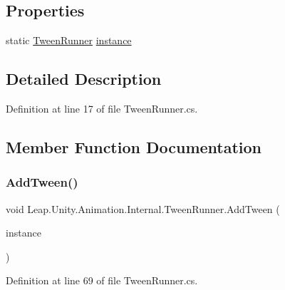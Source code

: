 \subsection*{Properties}
\begin{DoxyCompactItemize}
\item 
static \mbox{\hyperlink{class_leap_1_1_unity_1_1_animation_1_1_internal_1_1_tween_runner}{Tween\+Runner}} \mbox{\hyperlink{class_leap_1_1_unity_1_1_animation_1_1_internal_1_1_tween_runner_a17b39765b051fa31558883ada29043fc}{instance}}
\end{DoxyCompactItemize}


\subsection{Detailed Description}


Definition at line 17 of file Tween\+Runner.\+cs.



\subsection{Member Function Documentation}
\mbox{\label{class_leap_1_1_unity_1_1_animation_1_1_internal_1_1_tween_runner_aba1606d61c642a3122bce4426ada3546}} 
\subsubsection{\texorpdfstring{AddTween()}{AddTween()}}
{\footnotesize\ttfamily void Leap.\+Unity.\+Animation.\+Internal.\+Tween\+Runner.\+Add\+Tween (\begin{DoxyParamCaption}\item[{\mbox{\hyperlink{class_leap_1_1_unity_1_1_animation_1_1_internal_1_1_tween_instance}{Tween\+Instance}}}]{instance }\end{DoxyParamCaption})}



Definition at line 69 of file Tween\+Runner.\+cs.

\mbox{\label{class_leap_1_1_unity_1_1_animation_1_1_internal_1_1_tween_runner_ab415e5b8744f8fef7b33d4d01cad6e54}} 
